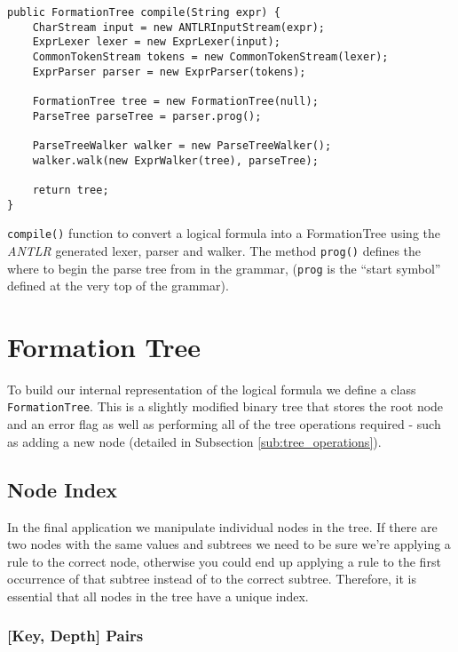 \documentclass[draft]{report}
\begin{document}
\begin{listing}[ht]
\begin{verbatim}
public FormationTree compile(String expr) {
    CharStream input = new ANTLRInputStream(expr);
    ExprLexer lexer = new ExprLexer(input);
    CommonTokenStream tokens = new CommonTokenStream(lexer);
    ExprParser parser = new ExprParser(tokens);
    
    FormationTree tree = new FormationTree(null);
    ParseTree parseTree = parser.prog();
    
    ParseTreeWalker walker = new ParseTreeWalker();
    walker.walk(new ExprWalker(tree), parseTree);

    return tree;
}
\end{verbatim}
\caption{{\tt compile()} function to convert a logical formula into a FormationTree using the \emph{ANTLR} generated lexer, parser and walker. The method {\tt prog()} defines the  where to begin the parse tree from in the grammar, ({\tt prog} is the ``start symbol'' defined at the very top of the grammar).}
\label{compile()}
\end{listing}

\section{Formation Tree}
\label{sec:formation_tree}

To build our internal representation of the logical formula we define a class {\tt FormationTree}. This is a slightly modified binary tree that stores the root node and an error flag as well as performing all of the tree operations required - such as adding a new node (detailed in Subsection \ref{sub:tree_operations}).

\subsection{Node Index}
\label{sub:node_index}

In the final application we manipulate individual nodes in the tree. If there are two nodes with the same values and subtrees we need to be sure we're applying a rule to the correct node, otherwise you could end up applying a rule to the first occurrence of that subtree instead of to the correct subtree. Therefore, it is essential that all nodes in the tree have a unique index.

\subsubsection{[Key, Depth] Pairs}
\end{document}
